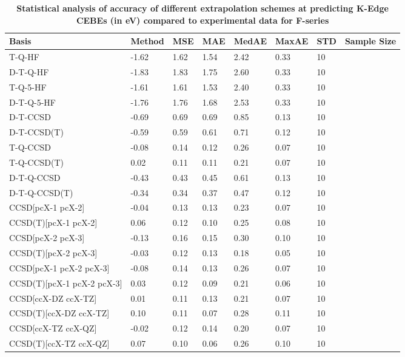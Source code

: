 \begin{table}
  \caption{\textbf{Statistical analysis of accuracy of different extrapolation schemes at predicting K-Edge CEBEs (in eV) compared to experimental data for F-series}}
  \label{tbl:extrap-scheme-summary-f}
  \begin{tabular}{l l l l l l l l }
    \toprule
    \textbf{Basis} & \textbf{Method} & \textbf{MSE} & \textbf{MAE} & \textbf{MedAE} & \textbf{MaxAE} & \textbf{STD} & \textbf{Sample Size} \\ 
    \midrule
    T-Q-HF & -1.62 & 1.62 & 1.54 & 2.42 & 0.33 & 10 \\ 
    D-T-Q-HF & -1.83 & 1.83 & 1.75 & 2.60 & 0.33 & 10 \\ 
    T-Q-5-HF & -1.61 & 1.61 & 1.53 & 2.40 & 0.33 & 10 \\ 
    D-T-Q-5-HF & -1.76 & 1.76 & 1.68 & 2.53 & 0.33 & 10 \\ 
    D-T-CCSD & -0.69 & 0.69 & 0.69 & 0.85 & 0.13 & 10 \\ 
    D-T-CCSD(T) & -0.59 & 0.59 & 0.61 & 0.71 & 0.12 & 10 \\ 
    T-Q-CCSD & -0.08 & 0.14 & 0.12 & 0.26 & 0.07 & 10 \\ 
    T-Q-CCSD(T) & 0.02 & 0.11 & 0.11 & 0.21 & 0.07 & 10 \\ 
    D-T-Q-CCSD & -0.43 & 0.43 & 0.45 & 0.61 & 0.13 & 10 \\ 
    D-T-Q-CCSD(T) & -0.34 & 0.34 & 0.37 & 0.47 & 0.12 & 10 \\ 
    CCSD[pcX-1 pcX-2] & -0.04 & 0.13 & 0.13 & 0.23 & 0.07 & 10 \\ 
    CCSD(T)[pcX-1 pcX-2] & 0.06 & 0.12 & 0.10 & 0.25 & 0.08 & 10 \\ 
    CCSD[pcX-2 pcX-3] & -0.13 & 0.16 & 0.15 & 0.30 & 0.10 & 10 \\ 
    CCSD(T)[pcX-2 pcX-3] & -0.03 & 0.12 & 0.13 & 0.18 & 0.05 & 10 \\ 
    CCSD[pcX-1 pcX-2 pcX-3] & -0.08 & 0.14 & 0.13 & 0.26 & 0.07 & 10 \\ 
    CCSD(T)[pcX-1 pcX-2 pcX-3] & 0.03 & 0.12 & 0.09 & 0.21 & 0.06 & 10 \\ 
    CCSD[ccX-DZ ccX-TZ] & 0.01 & 0.11 & 0.13 & 0.21 & 0.07 & 10 \\ 
    CCSD(T)[ccX-DZ ccX-TZ] & 0.10 & 0.11 & 0.07 & 0.28 & 0.11 & 10 \\ 
    CCSD[ccX-TZ ccX-QZ] & -0.02 & 0.12 & 0.14 & 0.20 & 0.07 & 10 \\ 
    CCSD(T)[ccX-TZ ccX-QZ] & 0.07 & 0.10 & 0.06 & 0.26 & 0.10 & 10 \\ 

\end{tabular}
\end{table}

